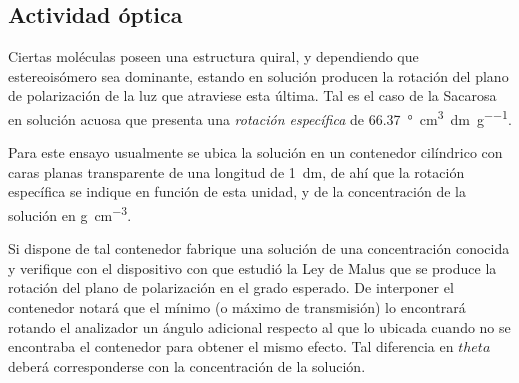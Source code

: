 \documentclass[laboratorio]{guia}
\begin{document}
\subsection{Actividad óptica}
Ciertas moléculas poseen una estructura quiral, y dependiendo que estereoisómero sea dominante, estando en solución producen la rotación del plano de polarización de la luz que atraviese esta última.
Tal es el caso de la Sacarosa en solución acuosa que presenta una \emph{rotación específica} de \SI{+66,37}{\degree\cubic\centi\metre\per\deci\metre\per\gram}.

Para este ensayo usualmente se ubica la solución en un contenedor cilíndrico con caras planas transparente de una longitud de \SI{1}{\deci\metre}, de ahí que la rotación específica se indique en función de esta unidad, y de la concentración de la solución en \si{\gram\per\cubic\centi\metre}.

Si dispone de tal contenedor fabrique una solución de una concentración conocida y verifique con el dispositivo con que estudió la Ley de Malus que se produce la rotación del plano de polarización en el grado esperado.
De interponer el contenedor notará que el mínimo (o máximo de transmisión) lo encontrará rotando el analizador un ángulo adicional respecto al que lo ubicada cuando no se encontraba el contenedor para obtener el mismo efecto.
Tal diferencia en \(theta\) deberá corresponderse con la concentración de la solución.



\nocite{Alonso1998,Hecht1986,Jenkins2001}
 

\end{document}
